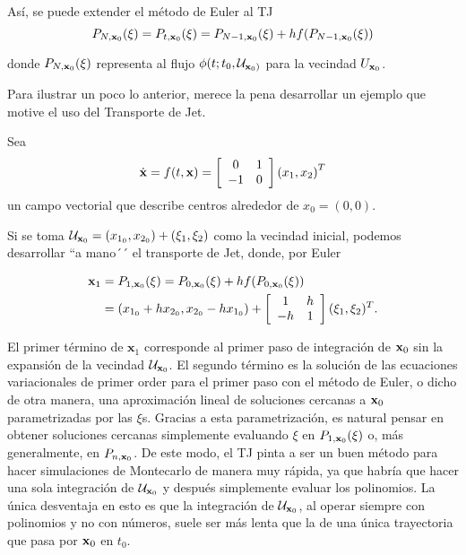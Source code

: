 Así, se puede extender el método de Euler al TJ 
\begin{equation}
P_{N,\mathbf{x}_0}(\xi) = P_{t,\mathbf{x}_0}(\xi) = P_{N-1,\mathbf{x}_0}(\xi) + h f(P_{N-1,\mathbf{x}_0}(\xi))
\label{eulerU}
\end{equation}

donde $P_{N,\mathbf{x}_0}(\xi)$ representa al flujo $\phi(t;t_0,\mathcal{U}_{\mathbf{x}_0)}$ para la vecindad $U_{\mathbf{x}_0}$.

Para ilustrar un poco lo anterior, merece la pena desarrollar un ejemplo que motive el uso del Transporte de Jet.

Sea
\begin{align}
\dot{\mathbf{x}} = f(t,\mathbf{x}) = \left[ \begin{array}{cc}
 0 & 1  \\
-1 & 0  \\
\end{array} \right] \left( x_1, x_2 \right)^T
\label{center}
\end{align}
un campo vectorial que describe centros alrededor de $x_0 = (0,0)$. 

Si se toma $\mathcal{U}_{\mathbf{x}_0} = (x_{1_0},x_{2_0}) + (\xi_1,\xi_2)$ como la vecindad inicial, podemos desarrollar ``a mano´´ el transporte de Jet, donde, por Euler

\begin{align*}
\mathbf{x}_1 &= P_{1,\mathbf{x}_0}(\xi) = P_{0,\mathbf{x}_0}(\xi) + h f(P_{0,\mathbf{x}_0}(\xi)) \\
&= (x_{1_0} + h x_{2_0}, x_{2_0} - h x_{1_0}) + \left[ \begin{array}{cc}
 1 & h  \\
-h & 1  \\
\end{array} \right] (\xi_1,\xi_2)^T.
\end{align*} 

El primer término de $\mathbf{x}_1$ corresponde al primer paso de integración de $\mathbf{x}_0$ sin la expansión de la vecindad $\mathcal{U}_{\mathbf{x}_0}$. El segundo término es la solución de las ecuaciones variacionales de primer order para el primer paso con el método de Euler, o dicho de otra manera, una aproximación lineal de soluciones cercanas a $\mathbf{x}_0$ parametrizadas por las $\xi$s. Gracias a esta parametrización, es natural pensar en obtener soluciones cercanas simplemente evaluando $\xi$ en $P_{1,\mathbf{x}_0}(\xi)$ o, más generalmente, en $P_{n,\mathbf{x}_0}$. De este modo, el TJ pinta a ser un buen método para hacer simulaciones de Montecarlo de manera muy rápida, ya que habría que hacer una sola integración de $\mathcal{U}_{\mathbf{x}_0}$ y después simplemente evaluar los polinomios. La única desventaja en esto es que la integración de $\mathcal{U}_{\mathbf{x}_0}$, al operar siempre con polinomios y no con números, suele ser más lenta que la de una única trayectoria que pasa por $\mathbf{x}_0$ en $t_0$.

